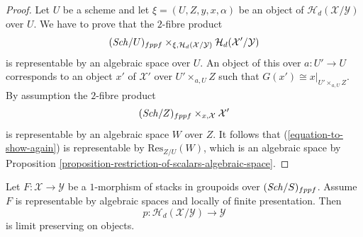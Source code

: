\begin{proof}
Let $U$ be a scheme and let $\xi = (U, Z, y, x, \alpha)$ be an object of
$\mathcal{H}_d(\mathcal{X}/\mathcal{Y})$ over $U$.
We have to prove that the $2$-fibre product
\begin{equation}
\label{equation-to-show-again}
(\mathit{Sch}/U)_{fppf}
\times_{\xi, \mathcal{H}_d(\mathcal{X}/\mathcal{Y})}
\mathcal{H}_d(\mathcal{X}'/\mathcal{Y})
\end{equation}
is representable by an algebraic space over $U$.
An object of this over $a : U' \to U$ corresponds to an object
$x'$ of $\mathcal{X}'$ over $U' \times_{a, U} Z$ such that
$G(x') \cong x|_{U' \times_{a, U} Z}$. By assumption the $2$-fibre product
$$
(\mathit{Sch}/Z)_{fppf} \times_{x, \mathcal{X}} \mathcal{X}'
$$
is representable by an algebraic space $W$ over $Z$. It follows that
(\ref{equation-to-show-again}) is representable by $\text{Res}_{Z/U}(W)$,
which is an algebraic space by
Proposition \ref{proposition-restriction-of-scalars-algebraic-space}.
\end{proof}

\begin{lemma}
\label{lemma-limit-preserving}
Let $F : \mathcal{X} \to \mathcal{Y}$ be a $1$-morphism of stacks in groupoids
over $(\mathit{Sch}/S)_{fppf}$. Assume $F$ is representable by algebraic
spaces and locally of finite presentation. Then
$$
p : \mathcal{H}_d(\mathcal{X}/\mathcal{Y}) \to \mathcal{Y}
$$
is limit preserving on objects.
\end{lemma}

